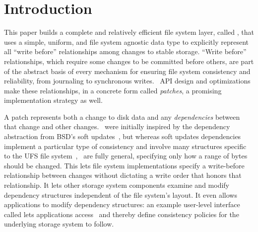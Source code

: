 
\section {Introduction}
\label{sec:intro}

\begin{comment}
This paper aims to evaluate whether a simple, unified abstraction that
represents all modifications to stable storage, including
\emph{dependencies} among modifications, can be used to efficiently
implement a complete file system layer, where modifications are common
and cache sizes are large.
%
The answer is a qualified yes.
\end{comment}


This paper builds a complete and relatively efficient file system layer,
 called \emph{\Featherstitch}, that uses
 a simple, uniform, and file system agnostic data type to explicitly
 represent all ``write before'' relationships among changes to stable
 storage.
%
``Write before'' relationships, which require some changes to be committed
 before others, are part of the abstract basis of every mechanism for ensuring file system
 consistency and reliability, from journaling to synchronous writes.
%
\Kudos\ API design and optimizations make these relationships, in a concrete form
 called \emph{patches}, a promising implementation strategy as well.


\begin{comment}
As file system functionality increases, maintaining file system
 correctness in the presence of failures is increasingly a focus of
 research~\cite{sivathanuetal05-logic,denehyetal05-journal-guided}.
%
File systems today deal with many challenges that make implementing this
 property difficult: power losses, software failures, and even user
 intervention all pose significant threats.
%
To meet this challenge, file systems use a variety of techniques, like
 journaling and soft updates.
%
These mechanisms are each based on imposing some ``write before''
 relationship among buffered changes to the data in stable storage.
%
The answer is a qualified yes.
\end{comment}


A patch represents both a change to disk data and any \emph{dependencies}
 between that change and other changes. 
%
\Patches\ were initially inspired by the dependency abstraction from BSD's soft
 updates~\cite{ganger00soft}, but whereas soft updates dependencies
 implement a particular type of consistency
 and involve many structures specific to the UFS file
 system~\cite{mckusick99soft}, \patches\ are fully general,
 specifying only how a range of bytes should be changed.
%
This lets file system implementations specify a
 write-before relationship between changes without dictating
 a write order that honors that relationship.
%
It lets other storage system components examine and
 modify dependency structures independent of the file system's layout.
%
It even allows applications to modify dependency structures: an example
 user-level interface called \emph{\patchgroups} lets applications access
 \patches\ and thereby define consistency policies for the underlying
 storage system to follow.


